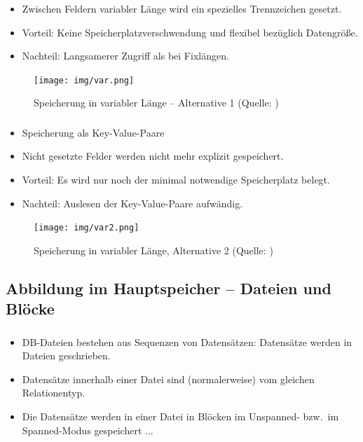 \begin{frame}
	\frametitle{\insertsection}
	\framesubtitle{\insertsubsection}
	\begin{itemize}
		\item Zwischen Feldern variabler L\"ange wird ein spezielles Trennzeichen gesetzt. 
		\item Vorteil: Keine Speicherplatzverschwendung und flexibel bez\"uglich Datengr\"o\ss e.
		\item Nachteil: Langsamerer Zugriff als bei Fixl\"angen.
	\end{itemize}	
	\begin{figure}
		\texttt{[image: img/var.png]}
		\caption{Speicherung in variabler L\"ange -- Alternative 1 (Quelle: \cite[S. 596]{EN10})}
	\end{figure}
\end{frame}

\begin{frame}
	\frametitle{\insertsection}
	\framesubtitle{\insertsubsection}
	\begin{itemize}
		\item Speicherung als Key-Value-Paare
		\item Nicht gesetzte Felder werden nicht mehr explizit gespeichert. 
		\item Vorteil: Es wird nur noch der minimal notwendige Speicherplatz belegt.
		\item Nachteil: Auslesen der Key-Value-Paare aufw\"andig.
	\end{itemize}
	\begin{figure}
		\texttt{[image: img/var2.png]}
		\caption{Speicherung in variabler L\"ange, Alternative 2 (Quelle: \cite[S. 596]{EN10})}
	\end{figure}
\end{frame}

\subsection{Abbildung im Hauptspeicher -- Dateien und Bl\"ocke}

\begin{frame}
	\frametitle{\insertsection}
	\framesubtitle{\insertsubsection}
    \begin{itemize}
    	\item DB-Dateien bestehen aus Sequenzen von Datens\"atzen: Datens\"atze werden in Dateien geschrieben.
      \item Datens\"atze innerhalb einer Datei sind (normalerweise) vom gleichen Relationentyp.
      \pause
      \item Die Datens\"atze werden in einer Datei in Bl\"ocken im Unspanned- bzw.~im Spanned-Modus gespeichert ...
    \end{itemize}
\end{frame}

